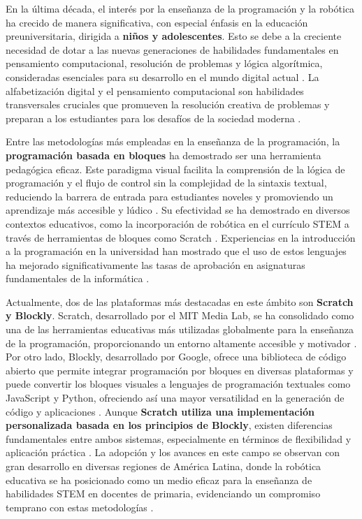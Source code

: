 
En la última década, el interés por la enseñanza de la programación y la robótica ha crecido de manera significativa, con especial énfasis en la educación preuniversitaria, dirigida a \textbf{niños y adolescentes}. Esto se debe a la creciente necesidad de dotar a las nuevas generaciones de habilidades fundamentales en pensamiento computacional, resolución de problemas y lógica algorítmica, consideradas esenciales para su desarrollo en el mundo digital actual \cite{Paredes2022}. La alfabetización digital y el pensamiento computacional son habilidades transversales cruciales que promueven la resolución creativa de problemas y preparan a los estudiantes para los desafíos de la sociedad moderna \cite{Klass2023_BenefitsCodeKids, CodeWeek2020_EarlyCode}.

Entre las metodologías más empleadas en la enseñanza de la programación, la \textbf{programación basada en bloques} ha demostrado ser una herramienta pedagógica eficaz. Este paradigma visual facilita la comprensión de la lógica de programación y el flujo de control sin la complejidad de la sintaxis textual, reduciendo la barrera de entrada para estudiantes noveles y promoviendo un aprendizaje más accesible y lúdico \cite{Paredes2023, Munoz2015}. Su efectividad se ha demostrado en diversos contextos educativos, como la incorporación de robótica en el currículo STEM a través de herramientas de bloques como Scratch \cite{Fuchs2021_ScratchRobotics}. Experiencias en la introducción a la programación en la universidad han mostrado que el uso de estos lenguajes ha mejorado significativamente las tasas de aprobación en asignaturas fundamentales de la informática \cite{Munoz2015}.

Actualmente, dos de las plataformas más destacadas en este ámbito son \textbf{Scratch y Blockly}. Scratch, desarrollado por el MIT Media Lab, se ha consolidado como una de las herramientas educativas más utilizadas globalmente para la enseñanza de la programación, proporcionando un entorno altamente accesible y motivador \cite{Paredes2023}. Por otro lado, Blockly, desarrollado por Google, ofrece una biblioteca de código abierto que permite integrar programación por bloques en diversas plataformas y puede convertir los bloques visuales a lenguajes de programación textuales como JavaScript y Python, ofreciendo así una mayor versatilidad en la generación de código y aplicaciones \cite{Munoz2015}. Aunque \textbf{Scratch utiliza una implementación personalizada basada en los principios de Blockly}, existen diferencias fundamentales entre ambos sistemas, especialmente en términos de flexibilidad y aplicación práctica \cite{Campana2016}. La adopción y los avances en este campo se observan con gran desarrollo en diversas regiones de América Latina, donde la robótica educativa se ha posicionado como un medio eficaz para la enseñanza de habilidades STEM en docentes de primaria, evidenciando un compromiso temprano con estas metodologías \cite{Torres2021_LATAMSTEM}.

